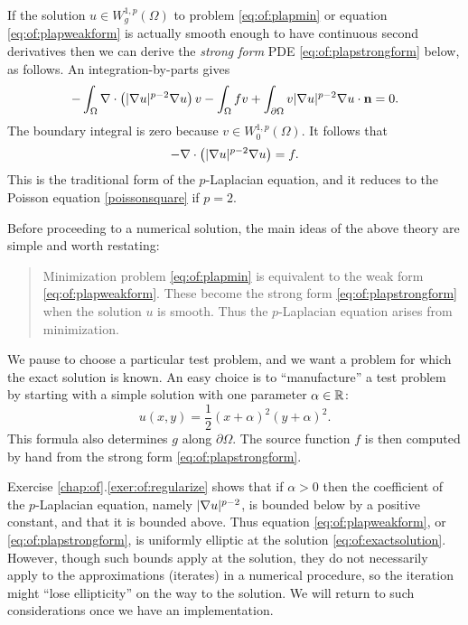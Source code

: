 If the solution $u \in W_g^{1,p}(\Omega)$ to problem \eqref{eq:of:plapmin} or equation \eqref{eq:of:plapweakform} is actually smooth enough to have continuous second derivatives then we can derive the \emph{strong form} PDE \eqref{eq:of:plapstrongform} below, as follows.  An integration-by-parts \citep[Appendix C]{Evans2010} gives
    $$-\int_\Omega \nabla\cdot\left(|\nabla u|^{p-2} \nabla u\right) v - \int_\Omega f v + \int_{\partial \Omega} v |\nabla u|^{p-2} \nabla u \cdot \mathbf{n} = 0.$$
The boundary integral is zero because $v\in W_0^{1,p}(\Omega)$.  It follows that
\begin{equation}
- \nabla\cdot\left(|\nabla u|^{p-2} \nabla u\right) = f.
\label{eq:of:plapstrongform}
\end{equation}
This is the traditional form of the $p$-Laplacian equation, and it reduces to the Poisson equation \eqref{poissonsquare} if $p=2$.

Before proceeding to a numerical solution, the main ideas of the above theory are simple and worth restating:
\begin{quote}
Minimization problem \eqref{eq:of:plapmin} is equivalent to the weak form \eqref{eq:of:plapweakform}.  These become the strong form \eqref{eq:of:plapstrongform} when the solution $u$ is smooth.  Thus the $p$-Laplacian equation arises from minimization.
\end{quote}

We pause to choose a particular test problem, and we want a problem for which the exact solution is known.  An easy choice is to ``manufacture'' a test problem by starting with a simple solution with one parameter $\alpha\in\mathbb{R}$:
\begin{equation}
    u(x,y) = \frac{1}{2} (x+\alpha)^2 (y+\alpha)^2. \label{eq:of:exactsolution}
\end{equation}
This formula also determines $g$ along $\partial \Omega$.  The source function $f$ is then computed by hand from the strong form \eqref{eq:of:plapstrongform}.

Exercise \ref{chap:of}.\ref{exer:of:regularize} shows that if $\alpha>0$ then the coefficient of the $p$-Laplacian equation, namely $|\nabla u|^{p-2}$, is bounded below by a positive constant, and that it is bounded above.  Thus equation \eqref{eq:of:plapweakform}, or \eqref{eq:of:plapstrongform}, is uniformly elliptic \citep{Evans2010} at the solution \eqref{eq:of:exactsolution}.  However, though such bounds apply at the solution, they do not necessarily apply to the approximations (iterates) in a numerical procedure, so the iteration might ``lose ellipticity'' on the way to the solution.  We will return to such considerations once we have an implementation.


